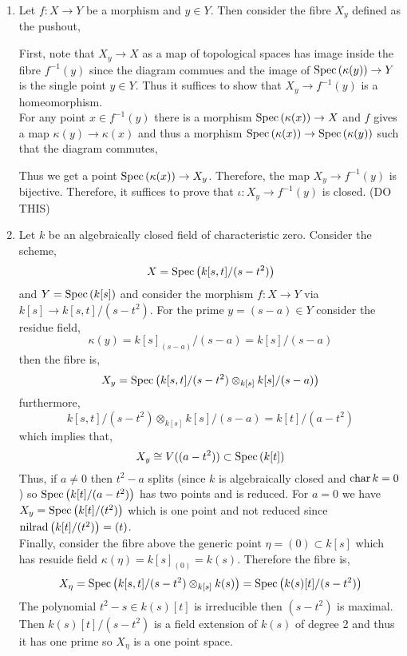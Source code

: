 \documentclass[12pt]{article}
\begin{document}
\begin{enumerate}
\item Let $f : X \to Y$ be a morphism and $y \in Y$. Then consider the fibre $X_y$ defined as the pushout,
\begin{center}
\end{center}
First, note that $X_y \to X$ as a map of topological spaces has image inside the fibre $f^{-1}(y)$ since the diagram commues and the image of $\mathrm{Spec}\left( \kappa(y) \right) \to Y$ is the single point $y \in Y$. Thus it suffices to show that $X_y \to f^{-1}(y)$ is a homeomorphism.
\bigskip\\
For any point $x \in f^{-1}(y)$ there is a morphism $\mathrm{Spec}\left( \kappa(x) \right) \to X$ and $f$ gives a map $\kappa(y) \to \kappa(x)$ and thus a morphism $\mathrm{Spec}\left( \kappa(x) \right) \to \mathrm{Spec}\left( \kappa(y) \right)$ such that the diagram commutes,
\begin{center}
\end{center} 
Thus we get a point $\mathrm{Spec}\left( \kappa(x) \right) \to X_y$. Therefore, the map $X_y \to f^{-1}(y)$ is bijective. Therefore, it suffices to prove that $\iota : X_y \to f^{-1}(y)$ is closed. (DO THIS)
\item Let $k$ be an algebraically closed field of characteristic zero. Consider the scheme,
\[ X = \mathrm{Spec}\left( k[s,t]/(s - t^2) \right) \]
and $Y = \mathrm{Spec}\left( k[s] \right)$ and consider the morphism $f : X \to Y$ via $k[s] \to k[s,t]/(s - t^2)$. For the prime $y = (s - a) \in Y$ consider the residue field,
\[ \kappa(y) = k[s]_{(s - a)} / (s - a) = k[s]/(s - a) \]
then the fibre is,
\[ X_y = \mathrm{Spec}\left( k[s,t]/(s - t^2) \otimes_{k[s]} k[s]/(s - a) \right) \]
furthermore,
\[ k[s,t]/(s - t^2) \otimes_{k[s]} k[s]/(s - a) = k[t]/(a - t^2) \]
which implies that,
\[ X_y \cong V((a - t^2)) \subset \mathrm{Spec}\left( k[t] \right) \]
Thus, if $a \neq 0$ then $t^2 - a$ splits (since $k$ is algebraically closed and $\operatorname{\mathrm{char}}{k} = 0$) so $\mathrm{Spec}\left( k[t]/(a - t^2) \right)$ has two points and is reduced. For $a = 0$ we have $X_y = \mathrm{Spec}\left( k[t]/(t^2) \right)$ which is one point and not reduced since $\mathrm{nilrad}\left( k[t]/(t^2) \right) = (t)$.  
\bigskip\\
Finally, consider the fibre above the generic point $\eta = (0) \subset k[s]$ which has resuide field $\kappa(\eta) = k[s]_{(0)} = k(s)$. Therefore the fibre is,
\[ X_\eta = \mathrm{Spec}\left( k[s, t]/(s - t^2) \otimes_{k[s]} k(s) \right) = \mathrm{Spec}\left( k(s)[t]/(s - t^2) \right) \] 
The polynomial $t^2 - s \in k(s)[t]$ is irreducible then $(s - t^2)$ is maximal. Then $k(s)[t]/(s - t^2)$ is a field extension of $k(s)$ of degree 2 and thus it has one prime so $X_\eta$ is a one point space.
\end{enumerate}
\end{document}
